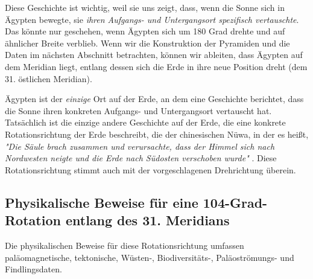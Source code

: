 \documentclass[10pt,twocolumn,letterpaper]{article}
\begin{document}
Diese Geschichte ist wichtig, weil sie uns zeigt, dass, wenn die Sonne sich in Ägypten bewegte, sie \textit{ihren Aufgangs- und Untergangsort spezifisch vertauschte}. Das könnte nur geschehen, wenn Ägypten sich um 180 Grad drehte und auf ähnlicher Breite verblieb. Wenn wir die Konstruktion der Pyramiden und die Daten im nächsten Abschnitt betrachten, können wir ableiten, dass Ägypten auf dem Meridian liegt, entlang dessen sich die Erde in ihre neue Position dreht (dem 31. östlichen Meridian).

Ägypten ist der \textit{einzige} Ort auf der Erde, an dem eine Geschichte berichtet, dass die Sonne ihren konkreten Aufgangs- und Untergangsort vertauscht hat. Tatsächlich ist die einzige andere Geschichte auf der Erde, die eine konkrete Rotationsrichtung der Erde beschreibt, die der chinesischen Nüwa, in der es heißt, \textit{"Die Säule brach zusammen und verursachte, dass der Himmel sich nach Nordwesten neigte und die Erde nach Südosten verschoben wurde"} \cite{8}. Diese Rotationsrichtung stimmt auch mit der vorgeschlagenen Drehrichtung überein.

\subsection{Physikalische Beweise für eine 104-Grad-Rotation entlang des 31. Meridians}

Die physikalischen Beweise für diese Rotationsrichtung umfassen paläomagnetische, tektonische, Wüsten-, Biodiversitäts-, Paläoströmungs- und Findlingsdaten.
\end{document}
